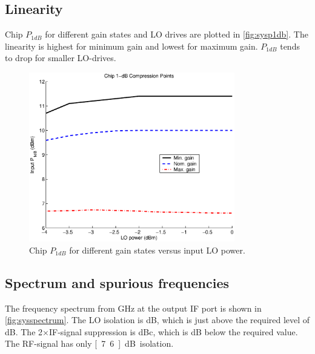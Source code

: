 		\subsection{Linearity}
			Chip $P_{1dB}$ for different gain states and LO drives are plotted in \autoref{fig:sysp1db}. The linearity is highest for minimum gain and lowest for maximum gain. $P_{1dB}$ tends to drop for smaller LO-drives.


			\begin{figure}[hbt!]
				\centering
				\includegraphics[width=0.8\textwidth]{fig/summary/chipp1db}
				\caption[Chip $P_{1dB}$.]{Chip $P_{1dB}$ for different gain states versus input LO power.}\label{fig:sysp1db}
			\end{figure}

		\subsection{Spectrum and spurious frequencies}
			The frequency spectrum from \unit[0 to 10]{GHz} at the output IF port is shown in \autoref{fig:sysspectrum}. The LO isolation is \unit[21]{dB}, which is just above the required level of \unit[20]{dB}. The 2$\times$IF-signal suppression is \unit[38]{dBc}, which is \unit[2]{dB} below the required value. The RF-signal has only \unit[7.6]{dB} isolation.

